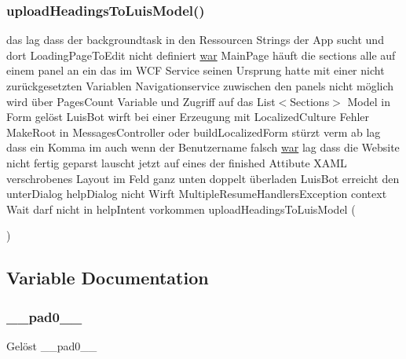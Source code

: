 \mbox{\label{_r_e_a_d_m_e_8txt_a2aaebc81a95fa9e9802135da338a8e3e}} 
\subsubsection{\texorpdfstring{upload\+Headings\+To\+Luis\+Model()}{uploadHeadingsToLuisModel()}}
{\footnotesize\ttfamily das lag dass der backgroundtask in den Ressourcen Strings der App sucht und dort Loading\+Page\+To\+Edit nicht definiert \mbox{\hyperlink{_r_e_a_d_m_e_8txt_a2a72fc7da943588cba8c302409b22e53}{war}} Main\+Page häuft die sections alle auf einem panel an ein das im W\+CF Service seinen Ursprung hatte mit einer nicht zurückgesetzten Variablen Navigationservice zuwischen den panels nicht möglich wird über Pages\+Count Variable und Zugriff auf das List$<$Sections$>$ Model in Form gelöst Luis\+Bot wirft bei einer Erzeugung mit Localized\+Culture Fehler Make\+Root in Messages\+Controller oder build\+Localized\+Form stürzt verm ab lag dass ein Komma im auch wenn der Benutzername falsch \mbox{\hyperlink{_r_e_a_d_m_e_8txt_a2a72fc7da943588cba8c302409b22e53}{war}} lag dass die Website nicht fertig geparst lauscht jetzt auf eines der finished Attibute X\+A\+ML verschrobenes Layout im Feld ganz unten doppelt überladen Luis\+Bot erreicht den unter\+Dialog help\+Dialog nicht Wirft Multiple\+Resume\+Handlers\+Exception context Wait darf nicht in help\+Intent vorkommen upload\+Headings\+To\+Luis\+Model (\begin{DoxyParamCaption}{ }\end{DoxyParamCaption})}



\subsection{Variable Documentation}
\mbox{\label{_r_e_a_d_m_e_8txt_a38ccef022a886075e294ad30cbfcae20}} 
\subsubsection{\texorpdfstring{\+\_\+\+\_\+pad0\+\_\+\+\_\+}{\_\_pad0\_\_}}
{\footnotesize\ttfamily Gelöst \+\_\+\+\_\+pad0\+\_\+\+\_\+}

